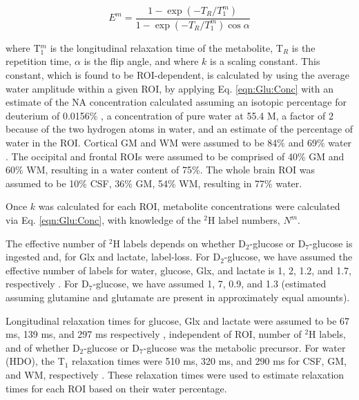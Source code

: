 \begin{equation}
    E^m = \frac{1-\exp(-T_R/T_1^m)}{1-\exp(-T_R/T_1^m)\cos{\alpha}}
    \label{eqn:Glu:Atte}
\end{equation}

where T$_1^m$ is the longitudinal relaxation time of the metabolite, T$_R$ is the repetition time, $\alpha$ is the flip angle, and where $k$ is a scaling constant. This constant, which is found to be \ac{ROI}-dependent, is calculated by using the average water amplitude within a given \ac{ROI}, by applying Eq. \ref{eqn:Glu:Conc} with an estimate of the \ac{NA} concentration calculated assuming an isotopic percentage for deuterium of 0.0156\% \cite{Hagemann1970AbsoluteSMOW}, a concentration of pure water at 55.4 M, a factor of 2 because of the two hydrogen atoms in water, and an estimate of the percentage of water in the \ac{ROI}. Cortical \ac{GM} and \ac{WM} were assumed to be 84\% and 69\% water \cite{Oros-Peusquens2019AImplications}. The occipital and frontal \ac{ROI}s were assumed to be comprised of 40\% \ac{GM} and 60\% \ac{WM}, resulting in a water content of 75\%. The whole brain \ac{ROI} was assumed to be 10\% \ac{CSF}, 36\% \ac{GM}, 54\% \ac{WM}, resulting in 77\% water.

Once $k$ was calculated for each \ac{ROI}, metabolite concentrations were calculated via Eq. \ref{eqn:Glu:Conc}, with knowledge of the $^2$H label numbers, $N^m$.

The effective number of $^2$H labels depends on whether D$_2$-glucose or D$_7$-glucose is ingested and, for Glx and lactate, label-loss. For D$_2$-glucose, we have assumed the effective number of labels for water, glucose, Glx, and lactate is 1, 2, 1.2, and 1.7, respectively \cite{DeGraaf2021CharacterizationStudies}. For D$_7$-glucose, we have assumed 1, 7, 0.9, and 1.3 (estimated \cite{Funk2017TheGlucose} assuming glutamine and glutamate are present in approximately equal amounts). 

Longitudinal relaxation times for glucose, Glx and lactate were assumed to be 67 ms, 139 ms, and 297 ms respectively \cite{DeFeyter2018DeuteriumVivo}, independent of \ac{ROI}, number of $^2$H labels, and of whether D$_2$-glucose or D$_7$-glucose was the metabolic precursor. For water (\ac{HDO}), the T$_1$ relaxation times were 510 ms, 320 ms, and 290 ms for \ac{CSF}, \ac{GM}, and \ac{WM}, respectively \cite{Cocking2023DeuteriumDosing}. These relaxation times were used to estimate relaxation times for each \ac{ROI} based on their water percentage.

